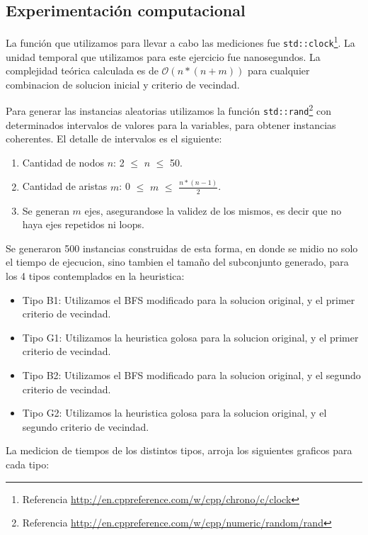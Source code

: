 \subsection{Experimentación computacional}

La función que utilizamos para llevar a cabo las mediciones fue \texttt{std::clock}\footnote{Referencia \url{http://en.cppreference.com/w/cpp/chrono/c/clock}}. La unidad temporal que utilizamos para este ejercicio fue nanosegundos.
La complejidad teórica calculada es de $\mathcal{O}(n*(n + m))$ para cualquier combinacion de solucion inicial y criterio de vecindad.

Para generar las instancias aleatorias utilizamos la función \texttt{std::rand}\footnote{Referencia \url{http://en.cppreference.com/w/cpp/numeric/random/rand}} con determinados intervalos de valores para la variables, para obtener instancias coherentes. El detalle de intervalos es el siguiente:

\begin{enumerate}
	\item Cantidad de nodos $n$: 2 $\leq$ $n$ $\leq$ 50.
    \item Cantidad de aristas $m$: 0 $\leq$ $m$ $\leq$ $\frac{n*(n-1)}{2}$.
    \item Se generan $m$ ejes, asegurandose la validez de los mismos, es decir que no haya ejes repetidos ni loops.
\end{enumerate}

Se generaron 500 instancias construidas de esta forma, en donde se midio no solo el tiempo de ejecucion, sino tambien el tamaño del subconjunto generado, para los 4 tipos contemplados en la heuristica:

\begin{itemize}
	\item Tipo B1: Utilizamos el BFS modificado para la solucion original, y el primer criterio de vecindad.
    \item Tipo G1: Utilizamos la heuristica golosa para la solucion original, y el primer criterio de vecindad.
    \item Tipo B2: Utilizamos el BFS modificado para la solucion original, y el segundo criterio de vecindad.
    \item Tipo G2: Utilizamos la heuristica golosa para la solucion original, y el segundo criterio de vecindad.
\end{itemize}

La medicion de tiempos de los distintos tipos, arroja los siguientes graficos para cada tipo:

